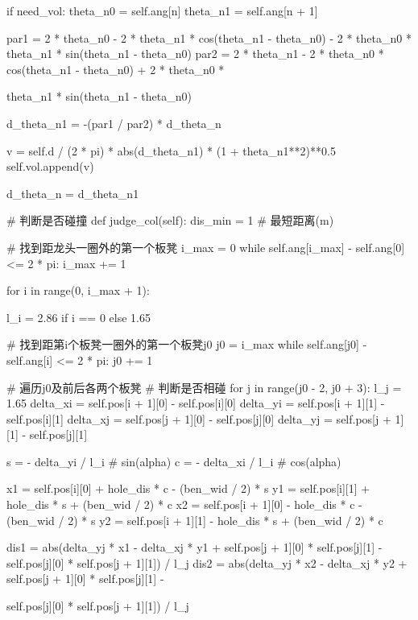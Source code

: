 \documentclass[withoutpreface,bwprint]{cumcmthesis}
\begin{document}
\begin{CodeText}
          if need_vol:
             theta_n0 = self.ang[n]
             theta_n1 = self.ang[n + 1]

             par1 = 2 * theta_n0 - 2 * theta_n1 * cos(theta_n1 - theta_n0) - 2 * theta_n0 *
                       theta_n1 * sin(theta_n1 - theta_n0)
             par2 = 2 * theta_n1 - 2 * theta_n0 * cos(theta_n1 - theta_n0) + 2 * theta_n0 *

                     theta_n1 * sin(theta_n1 - theta_n0)

          d_theta_n1 = -(par1 / par2) * d_theta_n

          v = self.d / (2 * pi) * abs(d_theta_n1) * (1 + theta_n1**2)**0.5
          self.vol.append(v)

          d_theta_n = d_theta_n1

# 判断是否碰撞
def judge_col(self):
   dis_min = 1 # 最短距离(m)

   # 找到距龙头一圈外的第一个板凳
   i_max = 0
   while self.ang[i_max] - self.ang[0] <= 2 * pi:
      i_max += 1

   for i in range(0, i_max + 1):

      l_i = 2.86 if i == 0 else 1.65

      # 找到距第i个板凳一圈外的第一个板凳j0
      j0 = i_max
      while self.ang[j0] - self.ang[i] <= 2 * pi:
          j0 += 1

      # 遍历j0及前后各两个板凳
      # 判断是否相碰
      for j in range(j0 - 2, j0 + 3):
          l_j = 1.65
          delta_xi = self.pos[i + 1][0] - self.pos[i][0]
          delta_yi = self.pos[i + 1][1] - self.pos[i][1]
          delta_xj = self.pos[j + 1][0] - self.pos[j][0]
          delta_yj = self.pos[j + 1][1] - self.pos[j][1]

          s = - delta_yi / l_i # sin(alpha)
          c = - delta_xi / l_i # cos(alpha)

          x1 = self.pos[i][0] + hole_dis * c - (ben_wid / 2) * s
          y1 = self.pos[i][1] + hole_dis * s + (ben_wid / 2) * c
          x2 = self.pos[i + 1][0] - hole_dis * c - (ben_wid / 2) * s
          y2 = self.pos[i + 1][1] - hole_dis * s + (ben_wid / 2) * c

          dis1 = abs(delta_yj * x1 - delta_xj * y1 + self.pos[j + 1][0] * self.pos[j][1] -
                     self.pos[j][0] * self.pos[j + 1][1]) / l_j
          dis2 = abs(delta_yj * x2 - delta_xj * y2 + self.pos[j + 1][0] * self.pos[j][1] -

                      self.pos[j][0] * self.pos[j + 1][1]) / l_j


\end{CodeText}
\end{document}
